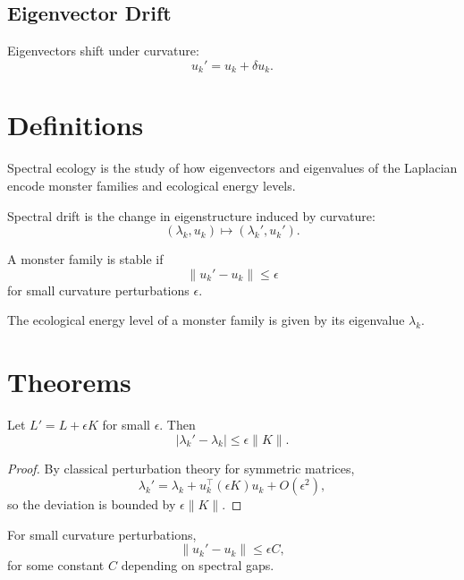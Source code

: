 \subsection{Eigenvector Drift}
Eigenvectors shift under curvature:
\[
u_k' = u_k + \delta u_k.
\]

\section{Definitions}

\begin{definition}
Spectral ecology is the study of how eigenvectors and eigenvalues of the
Laplacian encode monster families and ecological energy levels.
\end{definition}

\begin{definition}
Spectral drift is the change in eigenstructure induced by curvature:
\[
(\lambda_k, u_k) \mapsto (\lambda_k', u_k').
\]
\end{definition}

\begin{definition}
A monster family is stable if
\[
\|u_k' - u_k\| \le \epsilon
\]
for small curvature perturbations $\epsilon$.
\end{definition}

\begin{definition}
The ecological energy level of a monster family is given by its
eigenvalue $\lambda_k$.
\end{definition}

\section{Theorems}

\begin{theorem}
Let $L' = L + \epsilon K$ for small $\epsilon$. Then
\[
|\lambda_k' - \lambda_k| \le \epsilon \|K\|.
\]
\end{theorem}

\begin{proof}
By classical perturbation theory for symmetric matrices,
\[
\lambda_k' = \lambda_k + u_k^\top (\epsilon K) u_k + O(\epsilon^2),
\]
so the deviation is bounded by $\epsilon \|K\|$.
\end{proof}

\begin{theorem}
For small curvature perturbations,
\[
\|u_k' - u_k\| \le \epsilon C,
\]
for some constant $C$ depending on spectral gaps.
\end{theorem}

